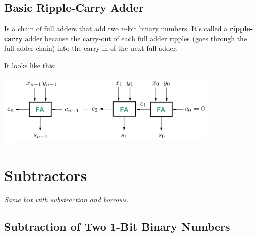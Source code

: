 \documentclass[12pt,openany, tikz,border=10pt]{book}
\begin{document}
\subsection{Basic Ripple-Carry Adder}
Is a chain of full adders that add two \( n \)-bit binary numbers. It's called a \textbf{ripple-carry} adder because the carry-out of each full adder ripples (goes through the full adder chain) into the carry-in of the next full adder.

\vspace{10px}

It looks like this:
\begin{center}
    \begin{minipage}[c]{0.80\textwidth} %
        \centering
        \includegraphics[width=0.80\textwidth]{circuits/8.1.7.png} %
    \end{minipage}
  
    \end{center}


\section{Subtractors}
\textit{Same but with substraction and borrows.}
\subsection{Subtraction of Two 1-Bit Binary Numbers}
\end{document}
